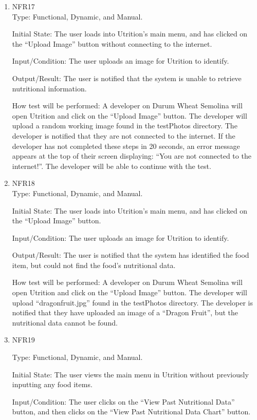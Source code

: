 \documentclass[12pt, titlepage]{article}
\begin{document}
\begin{enumerate}
		\item{NFR17\\}
		Type: Functional, Dynamic, and Manual.
		
		Initial State: The user loads into Utrition’s main menu, and has clicked on the “Upload Image” button without connecting to the internet.
		
		Input/Condition: The user uploads an image for Utrition to identify.
		
		Output/Result: The user is notified that the system is unable to retrieve nutritional information.
		
		How test will be performed: A developer on Durum Wheat Semolina will open Utrition and click on the “Upload Image” button. The developer will upload a random working image found in the testPhotos directory. The developer is notified that they are not connected to the internet. If the developer has not completed these steps in 20 seconds, an error message appears at the top of their screen displaying: “You are not connected to the internet!”. The developer will be able to continue with the test.
		
		\item{NFR18\\} 
		Type: Functional, Dynamic, and Manual.
		
		Initial State: The user loads into Utrition’s main menu, and has clicked on the “Upload Image” button.
		
		Input/Condition: The user uploads an image for Utrition to identify.
		
		Output/Result: The user is notified that the system has identified the food item, but could not find the food’s nutritional data.
		
		How test will be performed: A developer on Durum Wheat Semolina will open Utrition and click on the “Upload Image” button. The developer will upload “dragonfruit.jpg” found in the testPhotos directory. The developer is notified that they have uploaded an image of a “Dragon Fruit”, but the nutritional data cannot be found.
		
		\item{NFR19\\} 
		
		Type: Functional, Dynamic, and Manual.
		
		Initial State: The user views the main menu in Utrition without previously inputting any food items.
		
		Input/Condition: The user clicks on the “View Past Nutritional Data” button, and then clicks on the “View Past Nutritional Data Chart” button.
		

\end{enumerate}
\end{document}
